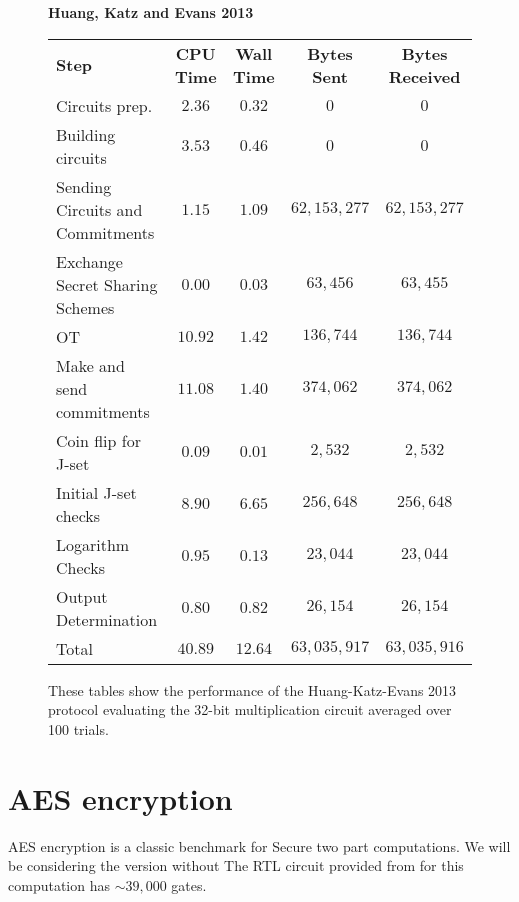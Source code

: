 \documentclass[ %
                    author={Nicholas Tutte},
                supervisor={Prof. Nigel Smart},
                    degree={MEng},
                     title={Secure Two Party Computation},
                  subtitle={A practical comparison of recent protocols},
                      type={Research - GG1K},
                      year={2015} ]{dissertation}
\begin{document}
				\begin{figure}[!ht]
					\textbf{Huang, Katz and Evans 2013}\\
					\begin{tabular}{| p{3.5cm} | c c c c |}
						\hline
						\textbf{Step} & \textbf{CPU Time} & \textbf{Wall Time} & \textbf{Bytes Sent} & \textbf{Bytes Received} \\
						\thickhline
						Circuits prep. & $2.36$ & $0.32$ & $0$ & $0$ \\
						\hline
						Building circuits & $3.53$ & $0.46$ & $0$ & $0$ \\
						\hline
						Sending Circuits and Commitments & $1.15$ & $1.09$ & $62,153,277$ & $62,153,277$ \\
						\hline
						Exchange Secret Sharing Schemes & $0.00$ & $0.03$ & $63,456$ & $63,455$ \\
						\hline
						OT & $10.92$ & $1.42$ & $136,744$ & $136,744$ \\
						\hline
						Make and send commitments & $11.08$ & $1.40$ & $374,062$ & $374,062$ \\
						\hline
						Coin flip for J-set & $0.09$ & $0.01$ & $2,532$ & $2,532$ \\
						\hline
						Initial J-set checks & $8.90$ & $6.65$ & $256,648$ & $256,648$ \\
						\hline
						Logarithm Checks & $0.95$ & $0.13$ & $23,044$ & $23,044$ \\
						\hline
						Output Determination & $0.80$ & $0.82$ & $26,154$ & $26,154$ \\
						\thickhline
						Total & $40.89$ & $12.64$ & $63,035,917$ & $63,035,916$ \\
						\hline
					\end{tabular}
					\caption{These tables show the performance of the Huang-Katz-Evans 2013 protocol evaluating the 32-bit multiplication circuit averaged over 100 trials.\label{table:HKE_2013_Mul}}
				\end{figure}

			\section{AES encryption}

				AES encryption is a classic benchmark for Secure two part computations. We will be considering the version without The RTL circuit provided from \cite{NigelCircuits} for this computation has $\sim 39,000$ gates.
\end{document}
